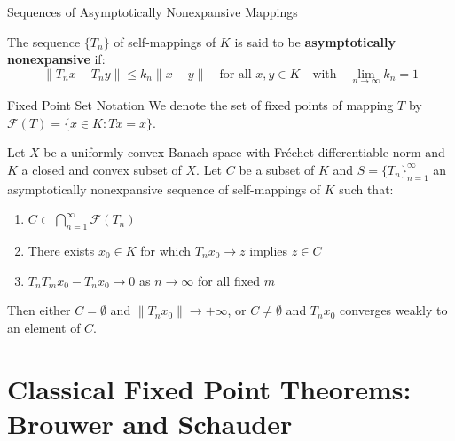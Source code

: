 \documentclass[aspectratio=169,10pt]{beamer}
\begin{document}
\begin{frame}[allowframebreaks]{Sequences of Asymptotically Nonexpansive Mappings}
    \begin{definition}[Definition 5.27]
        The sequence $\{T_n\}$ of self-mappings of $K$ is said to be \textbf{asymptotically nonexpansive} if:
        \[
        \|T_n x - T_n y\| \le k_n \|x - y\| \quad \text{for all } x, y \in K \quad \text{with} \quad \lim_{n \to \infty} k_n = 1
        \]
    \end{definition}

    \begin{block}{Fixed Point Set Notation}
        We denote the set of fixed points of mapping $T$ by $\mathcal{F}(T) = \{x \in K: Tx = x\}$.
    \end{block}

    \begin{theorem}
        Let $X$ be a uniformly convex Banach space with Fréchet differentiable norm and $K$ a closed and convex subset of $X$. Let $C$ be a subset of $K$ and $S = \{T_n\}_{n=1}^{\infty}$ an asymptotically nonexpansive sequence of self-mappings of $K$ such that:
        \begin{enumerate}
            \item $C \subset \bigcap_{n=1}^{\infty} \mathcal{F}(T_n)$
            \item There exists $x_0 \in K$ for which $T_n x_0 \to z$ implies $z \in C$
            \item $T_n T_m x_0 - T_n x_0 \to 0$ as $n \to \infty$ for all fixed $m$
        \end{enumerate}
        Then either $C = \emptyset$ and $\|T_n x_0\| \to +\infty$, or $C \neq \emptyset$ and $T_n x_0$ converges weakly to an element of $C$.
    \end{theorem}
\end{frame}

\section{Classical Fixed Point Theorems: Brouwer and Schauder}
\end{document}
